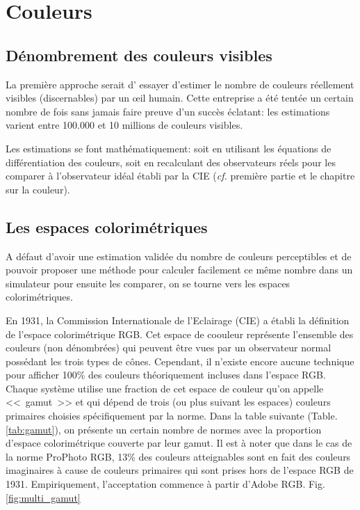 	\section{Couleurs}
	\subsection{Dénombrement des couleurs visibles}	
	\par La première approche serait d' essayer d'estimer le nombre de couleurs réellement visibles (discernables) par un œil humain. Cette entreprise a été tentée un certain nombre de fois \citep{kuehni_how_2015, linhares_number_2008, perales_calculation_2008, pointer_gamut_1980, pointer_number_1998, wen_display_2006} sans jamais faire preuve d'un succès éclatant: les estimations varient entre 100.000 et 10 millions de couleurs visibles.
	
	\par Les estimations se font mathématiquement: soit en utilisant les équations de différentiation des couleurs, soit en recalculant des observateurs réels pour les comparer à l'observateur idéal établi par la CIE (\textit{cf.} première partie et le chapitre sur la couleur).
	
	\subsection{Les espaces colorimétriques}
	\par A défaut d'avoir une estimation validée du nombre de couleurs perceptibles et de pouvoir proposer une méthode pour calculer facilement ce même nombre dans un simulateur pour ensuite les comparer, on se tourne vers les espaces colorimétriques.
	
	\par En 1931, la Commission Internationale de l'Eclairage (CIE) a établi la définition de l'espace colorimétrique RGB. Cet espace de coouleur représente l'ensemble des couleurs (non dénombrées) qui peuvent être vues par un observateur normal possédant les trois types de cônes. Cependant, il n'existe encore aucune technique pour afficher 100\% des couleurs théoriquement incluses dans l'espace RGB. Chaque système utilise une fraction de cet espace de couleur qu'on appelle <<~gamut~>> et qui dépend de trois (ou plus suivant les espaces) couleurs primaires choisies spécifiquement par la norme. Dans la table suivante (Table. \ref{tab:gamut}), on présente un certain nombre de normes avec la proportion d'espace colorimétrique couverte par leur gamut. Il est à noter que dans le cas de la norme ProPhoto RGB, 13\% des couleurs atteignables sont en fait des couleurs imaginaires à cause de couleurs primaires qui sont prises hors de l'espace RGB de 1931. Empiriquement, l'acceptation commence à partir d'Adobe RGB. Fig. \ref{fig:multi_gamut}

